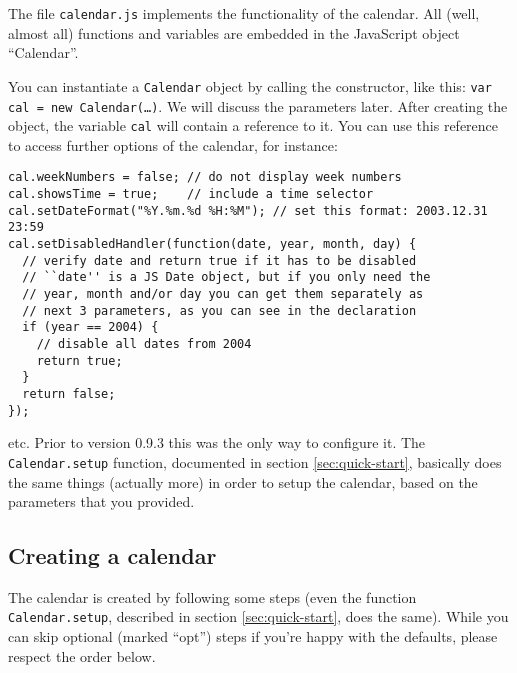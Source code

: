\documentclass[a4paper,10pt]{article}
\begin{document}
The file \texttt{calendar.js} implements the functionality of the calendar.
All (well, almost all) functions and variables are embedded in the JavaScript
object ``Calendar''.

You can instantiate a \texttt{Calendar} object by calling the constructor, like
this: \texttt{var cal = new Calendar(\ldots)}.  We will discuss the parameters
later.  After creating the object, the variable \texttt{cal} will contain a
reference to it.  You can use this reference to access further options of the
calendar, for instance:

\begin{verbatim}
cal.weekNumbers = false; // do not display week numbers
cal.showsTime = true;    // include a time selector
cal.setDateFormat("%Y.%m.%d %H:%M"); // set this format: 2003.12.31 23:59
cal.setDisabledHandler(function(date, year, month, day) {
  // verify date and return true if it has to be disabled
  // ``date'' is a JS Date object, but if you only need the
  // year, month and/or day you can get them separately as
  // next 3 parameters, as you can see in the declaration
  if (year == 2004) {
    // disable all dates from 2004
    return true;
  }
  return false;
});
\end{verbatim}

\noindent etc.  Prior to version
0.9.3 this was the only way to configure it.  The \texttt{Calendar.setup}
function, documented in section \ref{sec:quick-start}, basically does the same
things (actually more) in order to setup the calendar, based on the parameters
that you provided.

\subsection{Creating a calendar}

The calendar is created by following some steps (even the function
\texttt{Calendar.setup}, described in section \ref{sec:quick-start}, does the
same).  While you can skip optional (marked ``opt'') steps if you're happy with
the defaults, please respect the order below.
\end{document}
